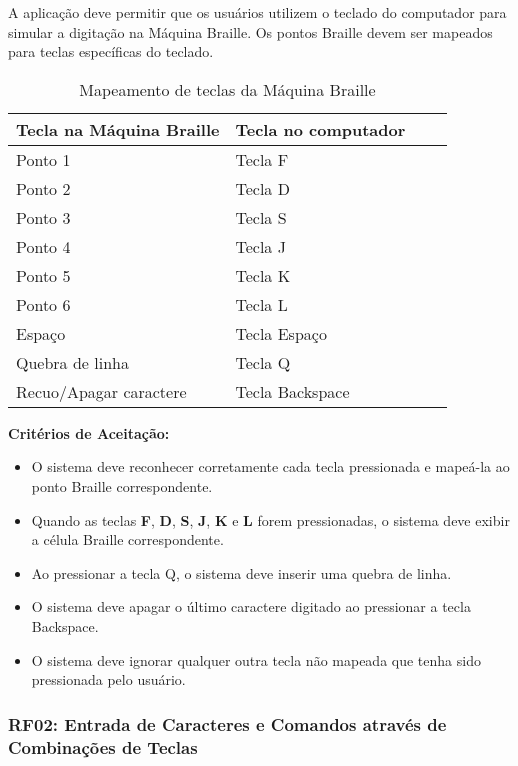 A aplicação deve permitir que os usuários utilizem o teclado do computador para simular a digitação na Máquina Braille. Os pontos Braille devem ser mapeados para teclas específicas do teclado.

\begin{table}[h]
    \caption{Mapeamento de teclas da Máquina Braille}
    \label{tab:Mapeamento-Teclas-Maquina-Braille}
    \centering
    \begin{tabular}{|p{0.5\linewidth}|p{0.5\linewidth}|} \hline 
        \textbf{Tecla na Máquina Braille} & \textbf{Tecla no computador} \\ \hline
        Ponto 1 & Tecla F \\ \hline
        Ponto 2 & Tecla D \\ \hline
        Ponto 3 & Tecla S \\ \hline
        Ponto 4 & Tecla J \\ \hline
        Ponto 5 & Tecla K \\ \hline
        Ponto 6 & Tecla L \\ \hline
        Espaço & Tecla Espaço \\ \hline
        Quebra de linha & Tecla Q \\ \hline
        Recuo/Apagar caractere & Tecla Backspace \\ \hline
    \end{tabular}
\end{table}

\textbf{Critérios de Aceitação:}
\begin{itemize}
    \item O sistema deve reconhecer corretamente cada tecla pressionada e mapeá-la ao ponto Braille correspondente.
    \item Quando as teclas \textbf{F}, \textbf{D}, \textbf{S}, \textbf{J}, \textbf{K} e \textbf{L} forem pressionadas, o sistema deve exibir a célula Braille correspondente.
    \item Ao pressionar a tecla Q, o sistema deve inserir uma quebra de linha.
    \item O sistema deve apagar o último caractere digitado ao pressionar a tecla Backspace.
    \item O sistema deve ignorar qualquer outra tecla não mapeada que tenha sido pressionada pelo usuário.
\end{itemize}

\subsubsection{\gls{RF}02: Entrada de Caracteres e Comandos através de Combinações de Teclas}

